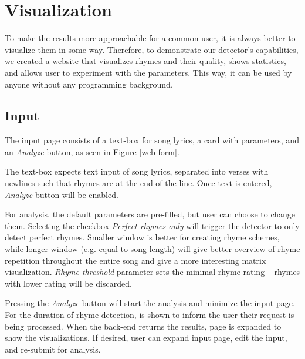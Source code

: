 \chapter{Visualization}\label{visualization}
To make the results more approachable for a common user, it is always better to visualize them in some way. Therefore, to demonstrate our detector's capabilities, we created a website that visualizes rhymes and their quality, shows statistics, and allows user to experiment with the parameters. This way, it can be used by anyone without any programming background.

\section{Input}
The input page consists of a text-box for song lyrics, a card with parameters, and an \textit{Analyze} button, as seen in Figure \ref{web-form}.

The text-box expects text input of song lyrics, separated into verses with newlines such that rhymes are at the end of the line. Once text is entered, \textit{Analyze} button will be enabled.

For analysis, the default parameters are pre-filled, but user can choose to change them. Selecting the checkbox \textit{Perfect rhymes only} will trigger the detector to only detect perfect rhymes.
Smaller window is better for creating rhyme schemes, while longer window (e.g. equal to  song length) will give better overview of rhyme repetition throughout the entire song and give a more interesting matrix visualization. \textit{Rhyme threshold} parameter sets the minimal rhyme rating -- rhymes with lower rating will be discarded.

Pressing the \textit{Analyze} button will start the analysis and minimize the input page. For the duration of rhyme detection,  is shown to inform the user their request is being processed. When the back-end returns the results,  page is expanded to show the visualizations. If desired, user can expand  input page, edit the input, and re-submit for analysis.

